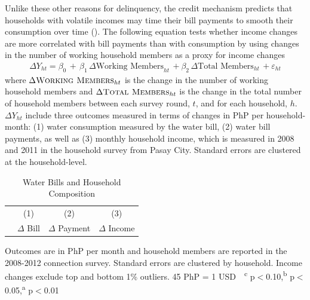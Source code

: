 \documentclass[12pt,table]{article}
\begin{document}


Unlike these other reasons for delinquency, the credit mechanism predicts that households with volatile incomes may time their bill payments to smooth their consumption over time (\cite{deaton1991saving}).  The following equation tests whether income changes are more correlated with bill payments than with consumption by using changes in the number of working household members as a proxy for income changes
\begin{align*}
\Delta Y_{ht} =\beta_0\,+\, \beta_1\, \Delta \text{Working Members}_{ht} \, + \beta_2\, \Delta \text{Total Members}_{ht}   \,+\varepsilon_{ht}
\end{align*}
where $ \Delta \textsc{Working Members}_{ht} $ is the change in the number of working household members and $\Delta \textsc{Total Members}_{ht}$ is the change in the total number of household members between each survey round, $t$, and for each household, $h$.  $\Delta Y_{ht}$ include three outcomes measured in terms of changes in PhP per household-month: (1) water consumption measured by the water bill, (2) water bill payments, as well as (3) monthly household income, which is measured in 2008 and 2011 in the household survey from Pasay City.  Standard errors are clustered at the household-level.

\begin{table}[!ht]
\small
\centering
\begin{threeparttable}
\caption{Water Bills and Household Composition}\label{table:panelanalysis}
\vspace{-2mm}
\begin{tabular}{@{}lccc@{}}
\toprule
 & \small (1) & \small (2) & \small (3)  \\
 & \small $\Delta$ Bill & \small $\Delta$ Payment & \small $\Delta$ Income \\[.5em]
 \toprule

\bottomrule
\end{tabular}
\begin{tablenotes}
\footnotesize
\item Outcomes are in PhP per month and household members are reported in the 2008-2012 connection survey.  Standard errors are clustered by household.  Income changes exclude top and bottom 1\% outliers.   45 PhP = 1 USD \,\, \textsuperscript{c} p$<$0.10,\textsuperscript{b} p$<$0.05,\textsuperscript{a} p$<$0.01 
\end{tablenotes}
\end{threeparttable}
\end{table}
\end{document}
